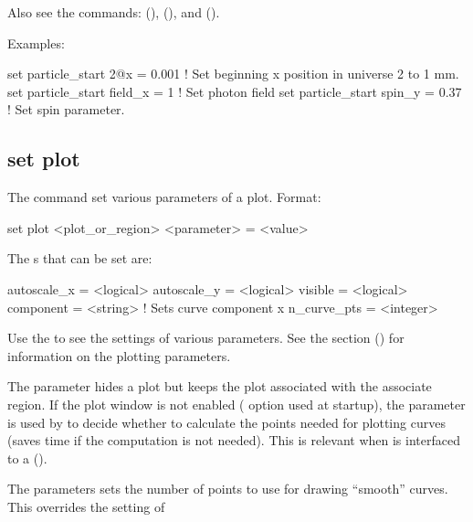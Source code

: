 {{Also see the commands:  (),  (), 
and  ().

Examples:
\begin{example}
  set particle_start 2@x = 0.001         ! Set beginning x position in universe 2 to 1 mm.
  set particle_start field_x = 1         ! Set photon field
  set particle_start spin_y = 0.37       ! Set spin parameter.
\end{example}


\subsection{set plot}
\label{s:set.plot}

The  command set various parameters of a plot. Format:
\begin{example}
  set plot <plot_or_region> <parameter> = <value>
\end{example}

The s that can be set are:
\begin{example}
  autoscale_x        = <logical>
  autoscale_y        = <logical>
  visible            = <logical>
  component          = <string>    ! Sets curve component 
  x%
  n_curve_pts        = <integer>
\end{example}
Use the  to see the settings of various parameters. See the  section () for information on the plotting parameters.

The  parameter hides a plot but keeps the plot associated with the associate region. If
the plot window is not enabled ( option used at startup), the  parameter is
used by \tao to decide whether to calculate the points needed for plotting curves (saves time if the
computation is not needed). This is relevant when \tao is interfaced to a 
().

The  parameters sets the number of points to use for drawing ``smooth'' curves. This
overrides the setting of \vn{plot_page%
intermediate calculations used to compute a smooth curve to use in the computation of other smooth
curves. \tao will only do this for curves that have \vn{plot_page%
points. Depending upon the circumstances, setting \vn{plot%
slow down plotting calculations significantly.

}}}}}
